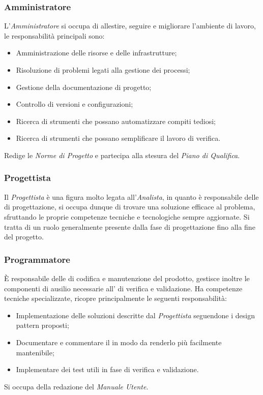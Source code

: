 \documentclass{scalatekids-article}
\begin{document}
\subsubsection{Amministratore}
L'\textit{Amministratore} si occupa di allestire, seguire e migliorare
l'ambiente di lavoro, le responsabilità principali sono:
\begin{itemize}
    \item Amministrazione delle risorse e delle infrastrutture;
    \item Risoluzione di problemi legati alla gestione dei processi;
    \item Gestione della documentazione di progetto;
    \item Controllo di versioni e configurazioni;
    \item Ricerca di strumenti che possano automatizzare compiti tediosi;
    \item Ricerca di strumenti che possano semplificare il lavoro di verifica.
\end{itemize}
Redige le \textit{Norme di Progetto} e partecipa alla stesura del \textit{Piano
di Qualifica}.

\subsubsection{Progettista}

Il \textit{Progettista} è una figura molto legata all'\textit{Analista}, in
quanto è responsabile delle  di progettazione, si occupa dunque di
trovare una soluzione efficace al problema, sfruttando le proprie competenze
tecniche e tecnologiche sempre aggiornate. Si tratta di un ruolo generalmente
presente dalla fase di progettazione fino alla fine del progetto.
\subsubsection{Programmatore}
È responsabile delle  di codifica e manutenzione del prodotto, gestisce
inoltre le componenti di ausilio necessarie all' di verifica e
validazione. Ha competenze tecniche specializzate, ricopre principalmente
le seguenti responsabilità:
\begin{itemize}
    \item Implementazione delle soluzioni descritte dal \textit{Progettista}
        seguendone i design pattern proposti;
    \item Documentare e commentare il  in modo da renderlo più facilmente
        mantenibile;
    \item Implementare dei test utili in fase di verifica e validazione.
\end{itemize}
Si occupa della redazione del \textit{Manuale Utente}.
\end{document}
